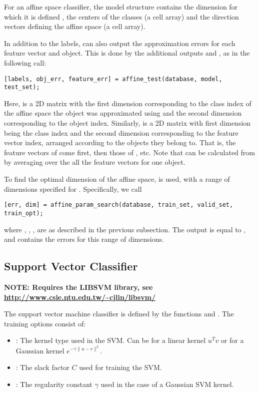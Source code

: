 \documentclass[twocolumn]{article}
\begin{document}
For an affine space classifier, the model structure contains the dimension for which it is defined , the centers of the classes  (a cell array) and the direction vectors defining the affine space  (a cell array).

In addition to the labels,  can also output the approximation errors for each feature vector and object. This is done by the additional outputs  and , as in the following call:
\begin{lstlisting}
[labels, obj_err, feature_err] = affine_test(database, model, test_set);
\end{lstlisting}
Here,  is a 2D matrix with the first dimension corresponding to the class index of the affine space the object was approximated using and the second dimension corresponding to the object index. Similarly,  is a 2D matrix with first dimension being the class index and the second dimension corresponding to the feature vector index, arranged according to the objects they belong to. That is, the feature vectors of  come first, then those of , etc. Note that  can be calculated from  by averaging over the all the feature vectors for one object.

To find the optimal dimension of the affine space,  is used, with a range of dimensions specified for . Specifically, we call
\begin{lstlisting}
[err, dim] = affine_param_search(database, train_set, valid_set, train_opt);
\end{lstlisting}
where , , ,  are as described in the previous subsection. The output  is equal to , and  contains the errors for this range of dimensions.

\subsection{Support Vector Classifier}

\textbf{NOTE: Requires the LIBSVM library, see \url{http://www.csie.ntu.edu.tw/~cjlin/libsvm/}}

The support vector machine classifier is defined by the functions  and . The training options consist of:
\begin{itemize}
	\item {}: The kernel type used in the SVM. Can be  for a linear kernel $u^Tv$ or  for a Gaussian kernel $e^{-\gamma\|u-v\|^2}$.
	\item {}: The slack factor $C$ used for training the SVM.
	\item {}: The regularity constant $\gamma$ used in the case of a Gaussian SVM kernel.
\end{itemize}
\end{document}
